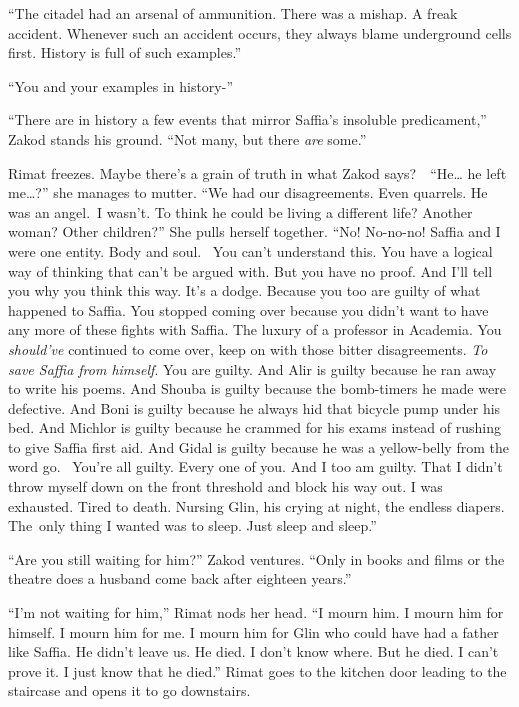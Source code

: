 \documentclass[twoside,11pt]{book}
\begin{document}
``The citadel had an arsenal of ammunition. There was a mishap. A freak accident. Whenever such an accident
occurs, they always blame underground cells first. History is full of such examples.'' 

``You and your examples in history-'' 

``There are in history a few events that mirror Saffia's insoluble predicament,'' Zakod stands
his ground. ``Not many, but there \textit{are} some.''

Rimat freezes. Maybe there's a grain of truth in what Zakod says?\ \ ``He{\dots} he left me{\dots}?'' she
manages to mutter. ``We had our disagreements. Even quarrels. He was an angel.\ I wasn't. To think he could be living a
different life? Another woman? Other children?'' She pulls herself together. ``No! No-no-no!
Saffia and I were one entity. Body and soul.~ You can't understand this. You have a logical way of thinking that can't
be argued with. But you have no proof. And I'll tell you why you think this way. It's a dodge. Because you too are
guilty of what happened to Saffia. You stopped coming over because you didn't want to have any more of these fights
with Saffia. The luxury of a professor in Academia. You \textit{should've} continued to come over, keep on with those
bitter disagreements. \textit{To save Saffia from himself}. You are guilty. And Alir is guilty because he ran away to
write his poems. And Shouba is guilty because the bomb-timers he made were defective. And Boni is guilty because he
always hid that bicycle pump under his bed. And Michlor is guilty because he crammed for his exams instead of rushing
to give Saffia first aid. And Gidal is guilty because he was a yellow-belly from the word go. \ You{}'re all guilty.
Every one of you. And I too am guilty. That I didn't throw myself down on the front threshold and block his way out. I
was exhausted. Tired to death. Nursing Glin, his crying at night, the endless diapers. The~only thing I wanted was to
sleep. Just sleep and sleep.'' 

``Are you still waiting for him?'' Zakod ventures. ``Only in books and films or
the theatre does a husband come back after eighteen years.''

``I'm not waiting for him,'' Rimat nods her head. ``I mourn him. I mourn him for
himself. I mourn him for me. I mourn him for Glin who could have had a father like Saffia. He didn't leave us. He died.
I don't know where. But he died. I can't prove it. I just know that he died.'' Rimat goes to the kitchen
door leading to the staircase and opens it to go downstairs. 
\end{document}
